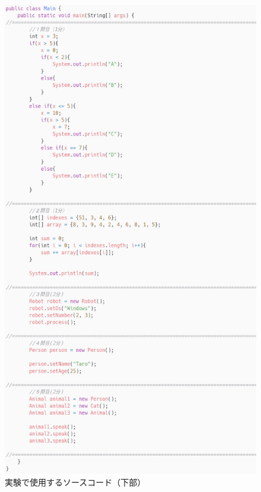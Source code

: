 \documentclass[paper=a4paper,fontsize=11pt]{jlreq}
\begin{document}
      \FloatBarrier
      \begin{figure}[h]
        \centering
        \includegraphics[height=\textheight]{carbon_clip_main.png}
        \caption{実験で使用するソースコード（下部）}
        \label{carbon_clip_main}
      \end{figure}
      \FloatBarrier
\end{document}
